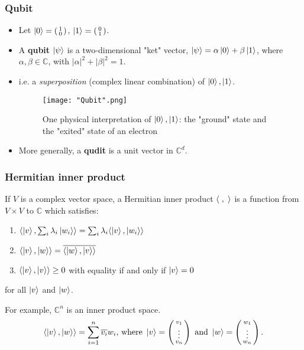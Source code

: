 \documentclass[handout, 10 pt]{beamer}
\newcommand{\icol}[1]{%
  \left(\begin{smallmatrix}#1\end{smallmatrix}\right)%
}
\begin{document}
\begin{frame}
\frametitle{Qubit}

\begin{itemize}
    \item Let $\ket{0} = \icol{1\\0}$, $\ket{1} = \icol{0\\1}$.
    \pause
    \item A \textbf{qubit} $\ket{\psi}$ is a two-dimensional "ket" vector, $\ket{\psi}=\alpha\ket{0}+\beta\ket{1}$, 
where $\alpha,\beta\in\mathbb{C}$, with $|\alpha|^2+|\beta|^2=1$.
\pause
\item i.e. a \textit{superposition} (complex linear combination) of $\ket{0}, \ket{1}$.
\pause
    \begin{figure}[h]
    \centering
    \texttt{[image: "Qubit".png]}
    \caption{One physical interpretation of $\ket{0},\ket{1}$: the "ground" state and the "exited" state of an electron}
    \label{fig: qubit}
    \end{figure}
\pause
\item More generally, a \textbf{qudit} is a unit vector in ${\mathbb{C}}^d$.
\end{itemize}
\end{frame}

\begin{frame}

\frametitle{Hermitian inner product}

If $V$ is a complex vector space, a Hermitian inner product $\langle\hspace{.1cm},\hspace{.1cm}\rangle$ is a function from $V \times V$ to $\mathbb{C}$ which satisfies: 
\pause
\begin{enumerate}
\item $\langle\ket{v}, \sum_i \lambda_i \ket{w_i}\rangle=\sum_i \lambda_i \langle\ket{v}, \ket{w_i}\rangle$
\pause
\item $\langle\ket{v}, \ket{w}\rangle=\overline{\langle\ket{w}, \ket{v}\rangle}$
\pause
\item $\langle\ket{v}, \ket{v}\rangle \ge 0$ \textrm{ with equality if and only if }$\ket{v}=0$
\pause
\end{enumerate}
for all $\ket{v}$ and $\ket{w}$.

\bigskip
For example, $\mathbb{C}^n$ is an inner product space.
\begin{equation} \label{inner product defn}
  \langle \ket{v},\ket{w}\rangle=\sum\limits_{i=1}^n \overline{v_i} w_i \textrm{, where }
  \ket{v}=\icol{v_1\\ \vdots\\v_n} \textrm{ and }\ket{w}=\icol{w_1\\ \vdots\\w_n}.
\end{equation}
\end{frame}
\end{document}
